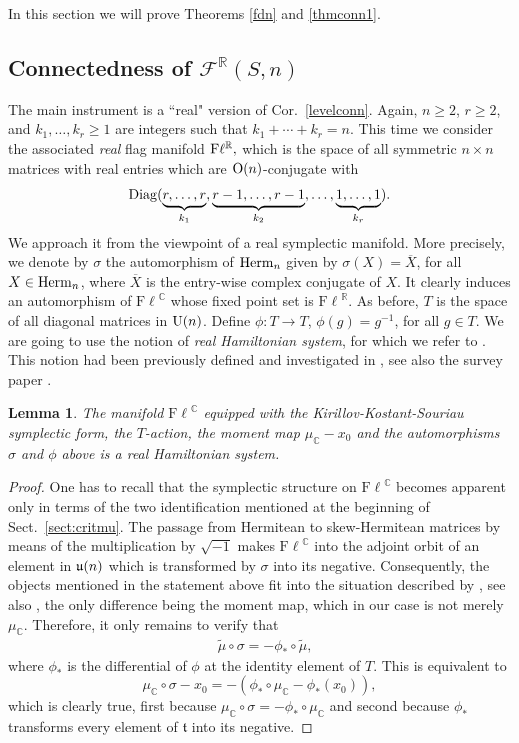\documentclass[12pt]{amsart}
\newtheorem{lem}[thm]{Lemma}
\theoremstyle{definition}
\theoremstyle{remark}
\newcommand{\RR}{\mathbb R}
\newcommand{\CC}{\mathbb C}
\newcommand{\Fl}{{\mathrm{F\ell}}}
\begin{document}
In this section we will prove Theorems \ref{fdn} and \ref{thmconn1}. 

\subsection{Connectedness of ${\mathcal F}^\RR(S, n)$}\label{sectreal1} The  main instrument is a ``real" version of  Cor.~\ref{levelconn}. 
Again, $n\ge 2$, $r\ge 2$, and $k_1, \ldots, k_r\ge 1$ are integers such that
$k_1+ \cdots + k_r=n$. 
This time we consider the associated {\it real} flag manifold ${\rm F}\ell^\RR,$ which is the space of all symmetric $n\times n$ matrices with real entries which are ${\rm O}(n)$-conjugate with
$${\rm Diag} (\underbrace{r, \dots, r}_{k_1},
\underbrace{r-1, \dots, r-1}_{k_2},
\dots,
\underbrace{1, \dots, 1}_{k_r}).$$
We approach it from the viewpoint of a real symplectic manifold. More precisely, we denote by $\sigma$ the automorphism of ${\rm Herm}_n$ given by 
$\sigma(X)=\overline{X}$, for all $X\in {\rm Herm}_n$, where $\overline{X}$ is the entry-wise complex conjugate of $X$. It clearly induces an automorphism of $\Fl^\CC$ 
whose 
fixed point set is $\Fl^\RR$. As before, $T$ is the space of all diagonal matrices in ${\rm U}(n)$. Define $\phi:T \to T$,  $\phi(g)= g^{-1}$, for all $g\in T$. 
We are going to use the notion of {\it real Hamiltonian system}, for which we refer to \cite[Definition 3]{BaHe}. This notion had been previously defined and investigated 
in \cite{SO}, see also the survey paper \cite{S}. 

\begin{lem} \label{realstr} The manifold $\Fl^\CC$ equipped with the Kirillov-Kostant-Souriau symplectic form, the $T$-action, the moment map $\mu_\CC - x_0$ and the automorphisms 
$\sigma$ and $\phi$ above is a real Hamiltonian system.
\end{lem}

\begin{proof} One has to recall that the symplectic structure on $\Fl^\CC$ becomes apparent only in terms of the two identification mentioned at the beginning of 
Sect.~\ref{sect:critmu}. The passage from Hermitean to skew-Hermitean matrices by means of the multiplication by $\sqrt{-1}$ makes $\Fl^\CC$ into the adjoint orbit of an element 
in ${\frak u}(n)$ which is transformed by $\sigma$ into its negative.  Consequently, the objects mentioned in the statement above fit into the situation described by \cite[Example 1.9]{SO}, see also \cite[Example 1.9]{S}, the only difference 
being the moment map, which in our case is not merely $\mu_\CC$. Therefore, it only remains to verify that
\begin{align*}
{}& \tilde{\mu} \circ \sigma = -\phi_* \circ \tilde{\mu},
\end{align*} 
where $\phi_*$ is the differential of $\phi$ at the identity element of $T$. 
This is equivalent  to
$$\mu_\CC\circ \sigma - x_0 = -(\phi_* \circ \mu_\CC - \phi_*( x_0)),$$
which is clearly true, first because $\mu_\CC\circ \sigma = -\phi_* \circ \mu_\CC$ and second because $\phi_*$ transforms every element of ${\mathfrak t}$ into its negative. 
\end{proof}
 
\end{document}
